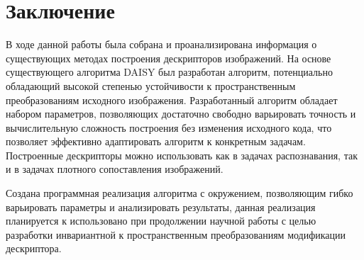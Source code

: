 {{{{\section*{Заключение}
{
    В ходе данной работы была собрана и проанализирована информация о существующих методах построения дескрипторов изображений. На основе существующего алгоритма DAISY был разработан алгоритм, потенциально обладающий высокой степенью устойчивости к пространственным преобразованиям исходного изображения.
    Разработанный алгоритм обладает набором параметров, позволяющих достаточно свободно варьировать точность и вычислительную сложность построения без изменения исходного кода, что позволяет эффективно адаптировать алгоритм к конкретным задачам. 
    Построенные дескрипторы можно использовать как в задачах распознавания, так и в задачах плотного сопоставления изображений.
    
    Создана программная реализация алгоритма с окружением, позволяющим гибко варьировать параметры и анализировать результаты, данная реализация планируется к использовано при продолжении научной работы с целью разработки инвариантной к пространственным преобразованиям модификации дескриптора.
}

\newpage
{}
{}
}}}}
